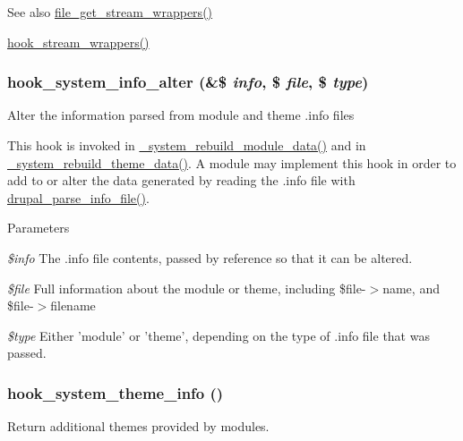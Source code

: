 \begin{DoxySeeAlso}{See also}
\hyperlink{group__file_ga0cd34cfd1bacb36b8ff82d01fb9a6f79}{file\_\-get\_\-stream\_\-wrappers()} 

\hyperlink{group__hooks_ga6fadcf625a4766e7f0d97b1628b294dc}{hook\_\-stream\_\-wrappers()} 
\end{DoxySeeAlso}
\hypertarget{group__hooks_ga7dd7f887131916d5bbbb02ae87a9113e}{
\subsubsection[{hook\_\-system\_\-info\_\-alter}]{\setlength{\rightskip}{0pt plus 5cm}hook\_\-system\_\-info\_\-alter (\&\$ {\em info}, \/  \$ {\em file}, \/  \$ {\em type})}}
\label{group__hooks_ga7dd7f887131916d5bbbb02ae87a9113e}
Alter the information parsed from module and theme .info files

This hook is invoked in \hyperlink{system_8module_aec98f44cde3933b35e0cb066d387c54c}{\_\-system\_\-rebuild\_\-module\_\-data()} and in \hyperlink{system_8module_ac3eaa9c509c1446605136070ddbf5016}{\_\-system\_\-rebuild\_\-theme\_\-data()}. A module may implement this hook in order to add to or alter the data generated by reading the .info file with \hyperlink{common_8inc_a277955232059631211fcfde533ea89d6}{drupal\_\-parse\_\-info\_\-file()}.


\begin{DoxyParams}{Parameters}
\item[{\em \$info}]The .info file contents, passed by reference so that it can be altered. \item[{\em \$file}]Full information about the module or theme, including \$file-\/$>$name, and \$file-\/$>$filename \item[{\em \$type}]Either 'module' or 'theme', depending on the type of .info file that was passed. \end{DoxyParams}
\hypertarget{group__hooks_gaf21de71044d5a79bde481d2383e12c9a}{
\subsubsection[{hook\_\-system\_\-theme\_\-info}]{\setlength{\rightskip}{0pt plus 5cm}hook\_\-system\_\-theme\_\-info ()}}
\label{group__hooks_gaf21de71044d5a79bde481d2383e12c9a}
Return additional themes provided by modules.


